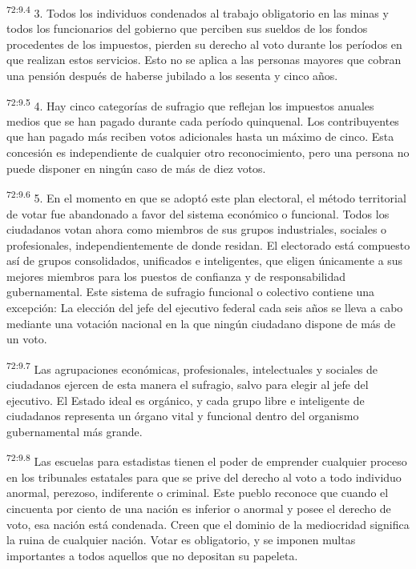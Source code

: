 \documentclass[twoside, 11pt]{book}
\begin{document}
\par
\textsuperscript{72:9.4} 3. Todos los individuos condenados al trabajo obligatorio en las minas y todos los funcionarios del gobierno que perciben sus sueldos de los fondos procedentes de los impuestos, pierden su derecho al voto durante los períodos en que realizan estos servicios. Esto no se aplica a las personas mayores que cobran una pensión después de haberse jubilado a los sesenta y cinco años.

\par
\textsuperscript{72:9.5} 4. Hay cinco categorías de sufragio que reflejan los impuestos anuales medios que se han pagado durante cada período quinquenal. Los contribuyentes que han pagado más reciben votos adicionales hasta un máximo de cinco. Esta concesión es independiente de cualquier otro reconocimiento, pero una persona no puede disponer en ningún caso de más de diez votos.

\par
\textsuperscript{72:9.6} 5. En el momento en que se adoptó este plan electoral, el método territorial de votar fue abandonado a favor del sistema económico o funcional. Todos los ciudadanos votan ahora como miembros de sus grupos industriales, sociales o profesionales, independientemente de donde residan. El electorado está compuesto así de grupos consolidados, unificados e inteligentes, que eligen únicamente a sus mejores miembros para los puestos de confianza y de responsabilidad gubernamental. Este sistema de sufragio funcional o colectivo contiene una excepción: La elección del jefe del ejecutivo federal cada seis años se lleva a cabo mediante una votación nacional en la que ningún ciudadano dispone de más de un voto.

\par
\textsuperscript{72:9.7} Las agrupaciones económicas, profesionales, intelectuales y sociales de ciudadanos ejercen de esta manera el sufragio, salvo para elegir al jefe del ejecutivo. El Estado ideal es orgánico, y cada grupo libre e inteligente de ciudadanos representa un órgano vital y funcional dentro del organismo gubernamental más grande.

\par
\textsuperscript{72:9.8} Las escuelas para estadistas tienen el poder de emprender cualquier proceso en los tribunales estatales para que se prive del derecho al voto a todo individuo anormal, perezoso, indiferente o criminal. Este pueblo reconoce que cuando el cincuenta por ciento de una nación es inferior o anormal y posee el derecho de voto, esa nación está condenada. Creen que el dominio de la mediocridad significa la ruina de cualquier nación. Votar es obligatorio, y se imponen multas importantes a todos aquellos que no depositan su papeleta.
\end{document}

